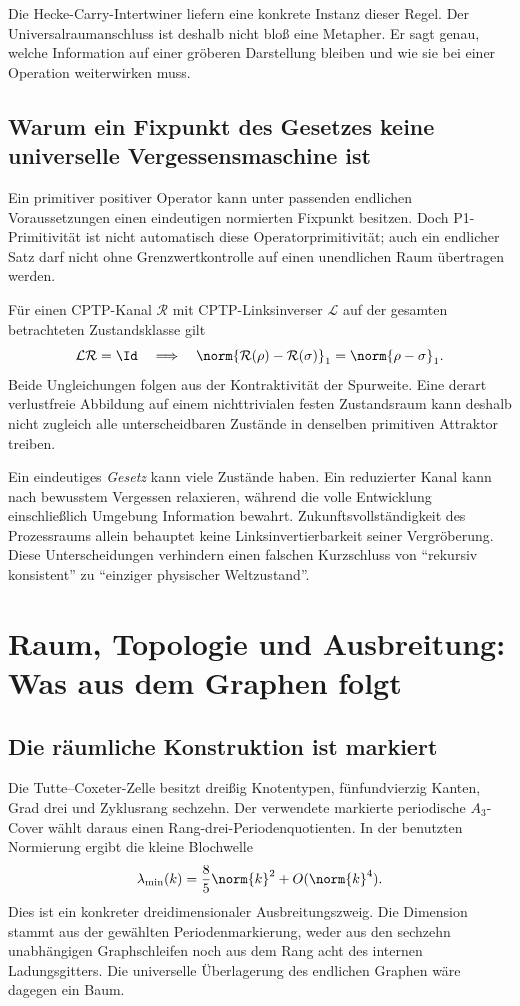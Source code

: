 Die Hecke-Carry-Intertwiner liefern eine konkrete Instanz dieser Regel. Der Universalraumanschluss ist deshalb nicht bloß eine Metapher. Er sagt genau, welche Information auf einer gröberen Darstellung bleiben und wie sie bei einer Operation weiterwirken muss.

\subsection{Warum ein Fixpunkt des Gesetzes keine universelle Vergessensmaschine ist}
Ein primitiver positiver Operator kann unter passenden endlichen Voraussetzungen einen eindeutigen normierten Fixpunkt besitzen. Doch P1-Primitivität ist nicht automatisch diese Operatorprimitivität; auch ein endlicher Satz darf nicht ohne Grenzwertkontrolle auf einen unendlichen Raum übertragen werden.

Für einen CPTP-Kanal $\mathcal R$ mit CPTP-Linksinverser $\mathcal L$ auf der gesamten betrachteten Zustandsklasse gilt
\begin{equation}
\mathcal L\mathcal R=\Id
\quad\Longrightarrow\quad
\norm{\mathcal R(\rho)-\mathcal R(\sigma)}_1
=\norm{\rho-\sigma}_1.
\end{equation}
Beide Ungleichungen folgen aus der Kontraktivität der Spurweite. Eine derart verlustfreie Abbildung auf einem nichttrivialen festen Zustandsraum kann deshalb nicht zugleich alle unterscheidbaren Zustände in denselben primitiven Attraktor treiben.

Ein eindeutiges \emph{Gesetz} kann viele Zustände haben. Ein reduzierter Kanal kann nach bewusstem Vergessen relaxieren, während die volle Entwicklung einschließlich Umgebung Information bewahrt. Zukunftsvollständigkeit des Prozessraums allein behauptet keine Linksinvertierbarkeit seiner Vergröberung. Diese Unterscheidungen verhindern einen falschen Kurzschluss von ``rekursiv konsistent'' zu ``einziger physischer Weltzustand''.

\section{Raum, Topologie und Ausbreitung: Was aus dem Graphen folgt}

\subsection{Die räumliche Konstruktion ist markiert}
Die Tutte--Coxeter-Zelle besitzt dreißig Knotentypen, fünfundvierzig Kanten, Grad drei und Zyklusrang sechzehn. Der verwendete markierte periodische $A_3$-Cover wählt daraus einen Rang-drei-Periodenquotienten. In der benutzten Normierung ergibt die kleine Blochwelle
\begin{equation}
\lambda_{\min}(k)=\frac85\norm{k}^2+O(\norm{k}^4).
\end{equation}
Dies ist ein konkreter dreidimensionaler Ausbreitungszweig. Die Dimension stammt aus der gewählten Periodenmarkierung, weder aus den sechzehn unabhängigen Graphschleifen noch aus dem Rang acht des internen Ladungsgitters. Die universelle Überlagerung des endlichen Graphen wäre dagegen ein Baum.

